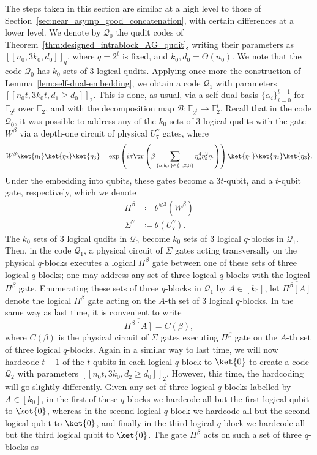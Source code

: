 \documentclass[11pt]{article}
\theoremstyle{definition}
\renewcommand{\geq}{\geqslant}
\newcommand{\qcode}{\mathcal{Q}}
\begin{document}
The steps taken in this section are similar at a high level to those of Section~\ref{sec:near_asymp_good_concatenation}, with certain differences at a lower level. We denote by $\qcode_0$ the qudit codes of Theorem~\ref{thm:designed_intrablock_AG_qudit}, writing their parameters as $[[n_0,3k_0,d_0]]_q$, where $q=2^t$ is fixed, and $k_0, d_0 = \Theta(n_0)$. We note that the code $\qcode_0$ has $k_0$ sets of 3 logical qudits. Applying once more the construction of Lemma~\ref{lem:self-dual-embedding}, we obtain a code $\qcode_1$ with parameters $[[n_0t,3k_0t,d_1 \geq d_0]]_2$. This is done, as usual, via a self-dual basis $\{\alpha_i\}_{i=0}^{t-1}$ for $\mathbb{F}_{2^t}$ over $\mathbb{F}_2$, and with the decomposition map $\mathcal{B}:\mathbb{F}_{2^t}\to\mathbb{F}_2^t$. Recall that in the code $\qcode_0$, it was possible to address any of the $k_0$ sets of 3 logical qudits with the gate $W^\beta$ via a depth-one circuit of physical $U_7^\gamma$ gates, where
\begin{equation}
    W^\beta\ket{\eta_1}\ket{\eta_2}\ket{\eta_3} = \exp\left(i\pi\tr\left(\beta\sum_{\{a,b,c\} \in \{1,2,3\}}\eta_a^4\eta_b^2\eta_c\right)\right)\ket{\eta_1}\ket{\eta_2}\ket{\eta_3}.
\end{equation}
Under the embedding into qubits, these gates become a $3t$-qubit, and a $t$-qubit gate, respectively, which we denote
\begin{align}
    \Pi^\beta &\coloneq \theta^{\otimes 3}(W^\beta)\\
    \Sigma^\gamma &\coloneq \theta(U_7^\gamma).
\end{align}
The $k_0$ sets of 3 logical qudits in $\qcode_0$ become $k_0$ sets of 3 logical $q$-blocks in $\qcode_1$. Then, in the code $\qcode_1$, a physical circuit of $\Sigma$ gates acting transversally on the physical $q$-blocks executes a logical $\Pi^\beta$ gate between one of these sets of three logical $q$-blocks; one may address any set of three logical $q$-blocks with the logical $\Pi^\beta$ gate. Enumerating these sets of three $q$-blocks in $\qcode_1$ by $A \in [k_0]$, let $\overline{\Pi^\beta[A]}$ denote the logical $\Pi^\beta$ gate acting on the $A$-th set of 3 logical $q$-blocks. In the same way as last time, it is convenient to write
\begin{equation}
    \overline{\Pi^\beta[A]} = C(\beta),
\end{equation}
where $C(\beta)$ is the physical circuit of $\Sigma$ gates executing $\Pi^\beta$ gate on the $A$-th set of three logical $q$-blocks. Again in a similar way to last time, we will now hardcode $t-1$ of the $t$ qubits in each logical $q$-block to $\ket{0}$ to create a code $\qcode_2$ with parameters $[[n_0t,3k_0,d_2 \geq d_0]]_2$. However, this time, the hardcoding will go slightly differently. Given any set of three logical $q$-blocks labelled by $A \in [k_0]$, in the first of these $q$-blocks we hardcode all but the first logical qubit to $\ket{0}$, whereas in the second logical $q$-block we hardcode all but the second logical qubit to $\ket{0}$, and finally in the third logical $q$-block we hardcode all but the third logical qubit to $\ket{0}$. The gate $\Pi^\beta$ acts on such a set of three $q$-blocks as
\end{document}
